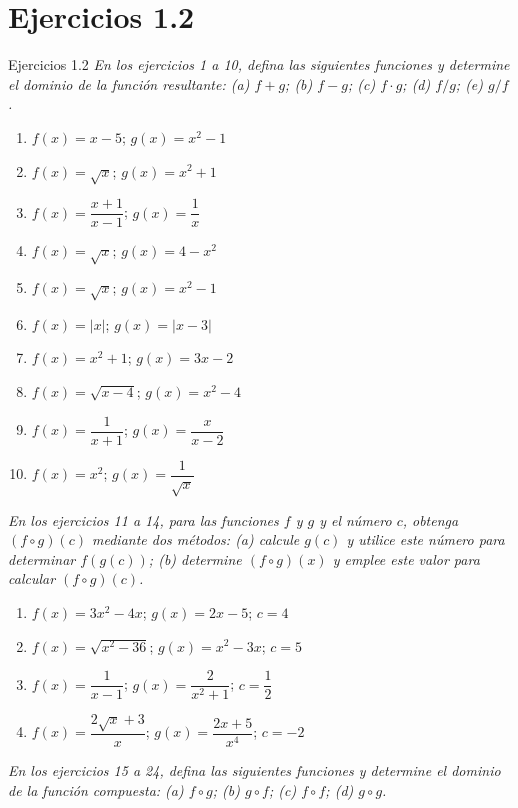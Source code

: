 \documentclass[aspectratio=169,10pt]{beamer}
\begin{document}
\section*{Ejercicios 1.2}
\begin{frame}{Ejercicios 1.2}
\textit{En los ejercicios 1 a 10, defina las siguientes funciones y determine el dominio de la función resultante: (a) $f+g$; (b) $f-g$; (c) $f\cdot g$; (d) $f/g$; (e) $g/f$.}

\begin{enumerate}
\item $f(x)=x-5$; $g(x)=x^2-1$
\item $f(x)=\sqrt{x}$; $g(x)=x^2+1$
\item $f(x)=\dfrac{x+1}{x-1}$; $g(x)=\dfrac1x$
\item $f(x)=\sqrt{x}$; $g(x)=4-x^2$
\item $f(x)=\sqrt{x}$; $g(x)=x^2-1$
\item $f(x)=|x|$; $g(x)=|x-3|$
\item $f(x)=x^2+1$; $g(x)=3x-2$
\item $f(x)=\sqrt{x-4}$; $g(x)=x^2-4$
\item $f(x)=\dfrac1{x+1}$; $g(x)=\dfrac{x}{x-2}$
\item $f(x)=x^2$; $g(x)=\dfrac1{\sqrt{x}}$
\end{enumerate}

\textit{En los ejercicios 11 a 14, para las funciones $f$ y $g$ y el número $c$, obtenga $(f\circ g)(c)$ mediante dos métodos: (a) calcule $g(c)$ y utilice este número para determinar $f(g(c))$; (b) determine $(f\circ g)(x)$ y emplee este valor para calcular $(f\circ g)(c)$.}

\begin{enumerate}
\item $f(x)=3x^2-4x$; $g(x)=2x-5$; $c=4$
\item $f(x)=\sqrt{x^2-36}$; $g(x)=x^2-3x$; $c=5$
\item $f(x)=\dfrac1{x-1}$; $g(x)=\dfrac2{x^2+1}$; $c=\dfrac12$
\item $f(x)=\dfrac{2\sqrt{x}+3}{x}$; $g(x)=\dfrac{2x+5}{x^4}$; $c=-2$
\end{enumerate}

\textit{En los ejercicios 15 a 24, defina las siguientes funciones y determine el dominio de la función compuesta: (a) $f\circ g$; (b) $g\circ f$; (c) $f\circ f$; (d) $g\circ g$.}


\end{frame}
\end{document}
